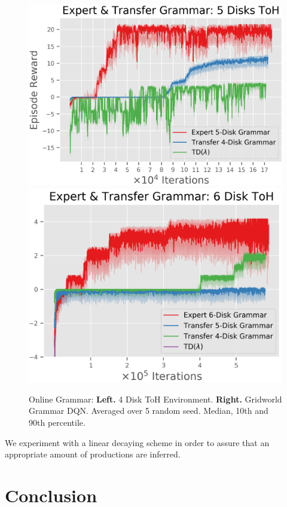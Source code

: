 \documentclass[10pt,letterpaper]{article}
\begin{document}
\begin{figure}[H]
  \includegraphics[width=\linewidth]{figures/hanoi_5_learning_curve}
\endminipage\hfill
{}
  \includegraphics[width=\linewidth]{figures/hanoi_6_learning_curve}
\endminipage\hfill
\caption{Online Grammar: \textbf{Left.} 4 Disk ToH Environment. \textbf{Right.} Gridworld Grammar DQN. Averaged over 5 random seed. Median, 10th and 90th percentile.}
\label{fig:online_grammar}
\end{figure}

We experiment with a linear decaying scheme in order to assure that an appropriate amount of productions are inferred.

\section{Conclusion}
\end{document}
